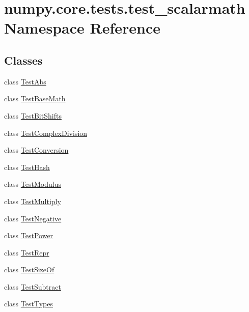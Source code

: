\hypertarget{namespacenumpy_1_1core_1_1tests_1_1test__scalarmath}{}\section{numpy.\+core.\+tests.\+test\+\_\+scalarmath Namespace Reference}
\label{namespacenumpy_1_1core_1_1tests_1_1test__scalarmath}
\subsection*{Classes}
\begin{DoxyCompactItemize}
\item 
class \hyperlink{classnumpy_1_1core_1_1tests_1_1test__scalarmath_1_1TestAbs}{Test\+Abs}
\item 
class \hyperlink{classnumpy_1_1core_1_1tests_1_1test__scalarmath_1_1TestBaseMath}{Test\+Base\+Math}
\item 
class \hyperlink{classnumpy_1_1core_1_1tests_1_1test__scalarmath_1_1TestBitShifts}{Test\+Bit\+Shifts}
\item 
class \hyperlink{classnumpy_1_1core_1_1tests_1_1test__scalarmath_1_1TestComplexDivision}{Test\+Complex\+Division}
\item 
class \hyperlink{classnumpy_1_1core_1_1tests_1_1test__scalarmath_1_1TestConversion}{Test\+Conversion}
\item 
class \hyperlink{classnumpy_1_1core_1_1tests_1_1test__scalarmath_1_1TestHash}{Test\+Hash}
\item 
class \hyperlink{classnumpy_1_1core_1_1tests_1_1test__scalarmath_1_1TestModulus}{Test\+Modulus}
\item 
class \hyperlink{classnumpy_1_1core_1_1tests_1_1test__scalarmath_1_1TestMultiply}{Test\+Multiply}
\item 
class \hyperlink{classnumpy_1_1core_1_1tests_1_1test__scalarmath_1_1TestNegative}{Test\+Negative}
\item 
class \hyperlink{classnumpy_1_1core_1_1tests_1_1test__scalarmath_1_1TestPower}{Test\+Power}
\item 
class \hyperlink{classnumpy_1_1core_1_1tests_1_1test__scalarmath_1_1TestRepr}{Test\+Repr}
\item 
class \hyperlink{classnumpy_1_1core_1_1tests_1_1test__scalarmath_1_1TestSizeOf}{Test\+Size\+Of}
\item 
class \hyperlink{classnumpy_1_1core_1_1tests_1_1test__scalarmath_1_1TestSubtract}{Test\+Subtract}
\item 
class \hyperlink{classnumpy_1_1core_1_1tests_1_1test__scalarmath_1_1TestTypes}{Test\+Types}
\end{DoxyCompactItemize}
